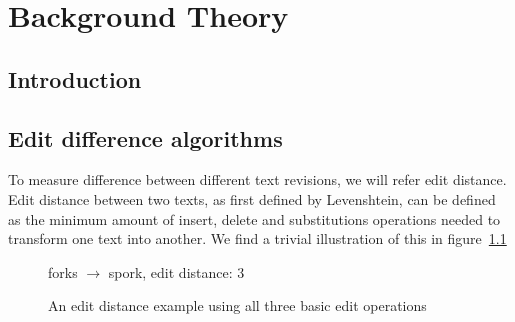 \chapter{Background Theory}

\label{ch:background}

\section{Introduction}
\section{Edit difference algorithms}
To measure difference between different text revisions, we will refer
edit distance. Edit distance between two texts, as first defined by
Levenshtein,\cite{Levenshtein1966} can be defined as the minimum
amount of insert, delete and substitutions operations needed to
transform one text into another. We find a trivial illustration of
this in figure~\ref{fig:fork-spork}

\begin{figure}
  \centering
  

  \vspace{3 mm}

  forks $\rightarrow$ spork, edit distance: 3
  
  \caption{An edit distance example using all three basic edit
    operations}
  \label{fig:fork-spork}
\end{figure}

